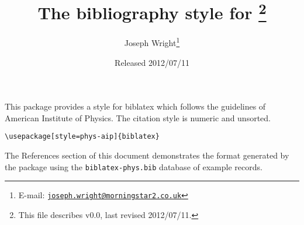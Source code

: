 \documentclass[a4paper]{ltxdoc}
\author{Joseph Wright\thanks{E-mail: 
  \href{mailto:joseph.wright@morningstar2.co.uk}
  {\texttt{joseph.wright@morningstar2.co.uk}}}}
\title{The \pkg{phys-aip} bibliography style for \pkg{biblatex}%
  \footnote{This file describes v0.0, last revised 2012/07/11.}}
\date{Released 2012/07/11}
\providecommand*{\pkg}[1]{\textsf{#1}}
\begin{document}
\maketitle

This package provides a style for \pkg{biblatex} which follows the
guidelines of American Institute of Physics. The citation style is numeric
and unsorted.
\begin{verbatim}
\usepackage[style=phys-aip]{biblatex}
\end{verbatim}
The References section of this document demonstrates the format 
generated by the package using the \texttt{biblatex-phys.bib} database
of example records.

\nocite{*}

\printbibliography
\end{document}
